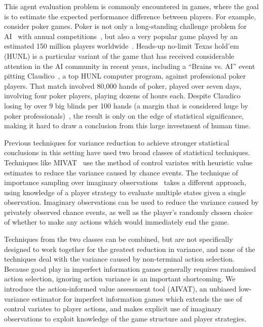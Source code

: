 \documentclass[letterpaper]{article}
\def\VAT{AIVAT}
\begin{document}
This agent evaluation problem is commonly encountered in games, where
the goal is to estimate the expected performance difference between
players. For example, consider poker games. Poker is not only a
long-standing challenge problem for
AI~\cite{VN28,KollerPfeffer97,BillingsEtAl02} with annual
competitions~\cite{ZinkevichLittman06,ACPC}, but also a very popular
game played by an estimated 150 million players
worldwide~\cite{Economist07}. Heads-up no-limit Texas hold'em (HUNL)
is a particular variant of the game that has received considerable
attention in the AI community in recent years, including a ``Brains
vs. AI'' event pitting Claudico~\cite{Claudico}, a top HUNL computer
program, against professional poker players. That match involved
80,000 hands of poker, played over seven days, involving four poker
players, playing dozens of hours each. Despite Claudico losing by over
9 big blinds per 100 hands (a margin that is considered huge by poker
professionals)~\cite{Pokerfuse-Claudico}, the result is only on the
edge of statistical significance, making it hard to draw a conclusion
from this large investment of human time.

Previous techniques for variance reduction to achieve stronger
statistical conclusions in this setting have used two broad classes of
statistical techniques. Techniques like MIVAT~\cite{09white-mivat} use
the method of control variates with heuristic value estimates to
reduce the variance caused by chance events. The technique of
importance sampling over imaginary observations~\cite{08icml-ispoker}
takes a different approach, using knowledge of a player strategy to
evaluate multiple states given a single observation. Imaginary
observations can be used to reduce the variance caused by privately
observed chance events, as well as the player's randomly chosen choice
of whether to make any actions which would immediately end the game.

Techniques from the two classes can be combined, but are not
specifically designed to work together for the greatest reduction in
variance, and none of the techniques deal with the variance caused by
non-terminal action selection. Because good play in imperfect
information games generally requires randomised action selection,
ignoring action variance is an important shortcoming. We introduce the
action-informed value assessment tool (\VAT{}), an unbiased
low-variance estimator for imperfect information games which extends
the use of control variates to player actions, and makes explicit use
of imaginary observations to exploit knowledge of the game structure
and player strategies.
\end{document}

